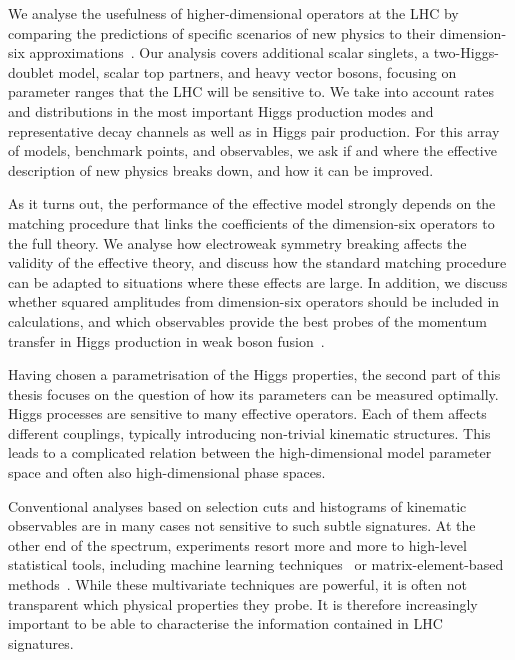 We analyse the usefulness of higher-dimensional operators at the LHC
by comparing the predictions of specific scenarios of new physics to
their dimension-six approximations~\cite{Brehmer:2015rna}. Our
analysis covers additional scalar singlets, a two-Higgs-doublet model,
scalar top partners, and heavy vector bosons, focusing on parameter
ranges that the LHC will be sensitive to. We take into account rates
and distributions in the most important Higgs production modes and
representative decay channels as well as in Higgs pair production. For
this array of models, benchmark points, and observables, we ask if and
where the effective description of new physics breaks down, and how it
can be improved.

As it turns out, the performance of the effective model strongly
depends on the matching procedure that links the coefficients of the
dimension-six operators to the full theory. We analyse how electroweak
symmetry breaking affects the validity of the effective theory, and
discuss how the standard matching procedure can be adapted to
situations where these effects are large. In addition, we discuss
whether squared amplitudes from dimension-six operators should be
included in calculations, and which observables provide the best
probes of the momentum transfer in Higgs production in weak boson
fusion~\cite{Biekotter:2016ecg}.

\newparagraph
%
Having chosen a parametrisation of the Higgs properties, the second part
of this thesis focuses on the question of how its parameters can be
measured optimally. Higgs processes are sensitive to many effective
operators. Each of them affects different couplings, typically
introducing non-trivial kinematic structures. This leads to a
complicated relation between the high-dimensional model parameter
space and often also high-dimensional phase spaces.

Conventional analyses based on selection cuts and histograms of
kinematic observables are in many cases not sensitive to such subtle
signatures.  At the other end of the spectrum, experiments resort more
and more to high-level statistical tools, including machine learning
techniques~\cite{Cranmer:2015bka, Louppe:2016ylz, Louppe:2016aov,
  Cranmer:2016lzt, Baldi:2016fzo, Brehmer:ghost_probability,
  Cogan:2014oua, Baldi:2014pta, deOliveira:2015xxd, Almeida:2015jua,
  Baldi:2016fql, Guest:2016iqz, Komiske:2016rsd, Kasieczka:2017nvn,
  Louppe:2017ipp, Baldi:2014kfa, Searcy:2015apa, Santos:2016kno,
  Alves:2016htj, Buckley:2011kc, Bornhauser:2013aya, Bechtle:2017vyu}
or matrix-element-based methods~\cite{Kondo:1988yd, Abazov:2004cs,
  Gao:2010qx, Alwall:2010cq, Avery:2012um, Andersen:2012kn,
  Campbell:2013hz, Artoisenet:2013vfa, Martini:2015fsa,
  Gritsan:2016hjl, Soper:2011cr, Soper:2012pb, Soper:2014rya,
  Atwood:1991ka, Davier:1992nw, Diehl:1993br}. While these
multivariate techniques are powerful, it is often not transparent
which physical properties they probe. It is therefore increasingly
important to be able to characterise the information contained in LHC
signatures.

